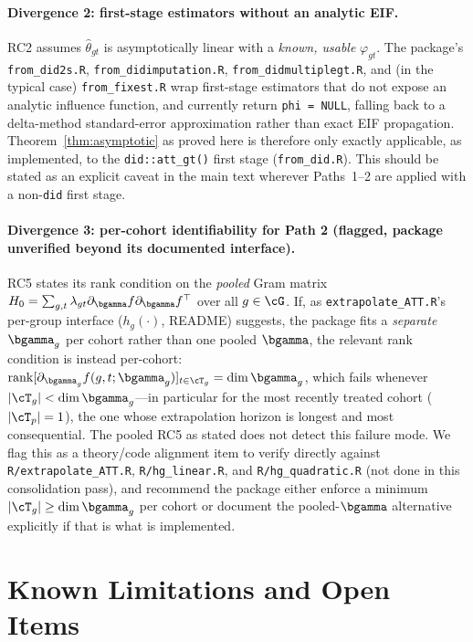 \documentclass{article}
\begin{document}
\paragraph{Divergence 2: first-stage estimators without an analytic EIF.} RC2 assumes $\widehat\theta_{gt}$ is asymptotically linear with a \emph{known, usable} $\varphi_{gt}$. The package's \texttt{from\_did2s.R}, \texttt{from\_didimputation.R}, \texttt{from\_didmultiplegt.R}, and (in the typical case) \texttt{from\_fixest.R} wrap first-stage estimators that do not expose an analytic influence function, and currently return \texttt{phi = NULL}, falling back to a delta-method standard-error approximation rather than exact EIF propagation. Theorem~\ref{thm:asymptotic} as proved here is therefore only exactly applicable, as implemented, to the \texttt{did::att\_gt()} first stage (\texttt{from\_did.R}). This should be stated as an explicit caveat in the main text wherever Paths~1--2 are applied with a non-\texttt{did} first stage.

\paragraph{Divergence 3: per-cohort identifiability for Path 2 (flagged, package unverified beyond its documented interface).} RC5 states its rank condition on the \emph{pooled} Gram matrix $H_0=\sum_{g,t}\lambda_{gt}\partial_{\bgamma} f\partial_{\bgamma} f^\top$ over all $g\in\cG$. If, as \texttt{extrapolate\_ATT.R}'s per-group interface ($h_g(\cdot)$, README) suggests, the package fits a \emph{separate} $\bgamma_g$ per cohort rather than one pooled $\bgamma$, the relevant rank condition is instead per-cohort: $\mathrm{rank}[\partial_{\bgamma_g}f(g,t;\bgamma_g)]_{t\in\cT_g}=\dim\bgamma_g$, which fails whenever $|\cT_g|<\dim\bgamma_g$---in particular for the most recently treated cohort ($|\cT_p|=1$), the one whose extrapolation horizon is longest and most consequential. The pooled RC5 as stated does not detect this failure mode. We flag this as a theory/code alignment item to verify directly against \texttt{R/extrapolate\_ATT.R}, \texttt{R/hg\_linear.R}, and \texttt{R/hg\_quadratic.R} (not done in this consolidation pass), and recommend the package either enforce a minimum $|\cT_g|\geq\dim\bgamma_g$ per cohort or document the pooled-$\bgamma$ alternative explicitly if that is what is implemented.

\section{Known Limitations and Open Items}
\label{sec:limitations}
\end{document}
